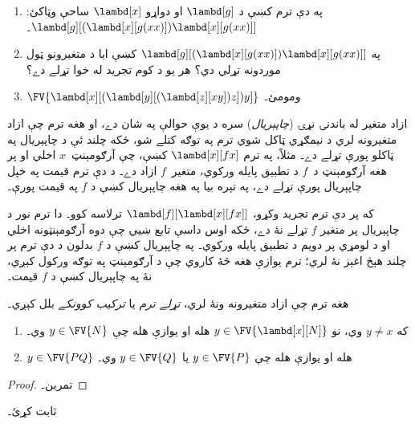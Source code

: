 \documentclass[../../../include/open-logic-section]{subfiles}
\begin{document}
\begin{prob}
  \begin{enumerate}
  \item په دې ترم کښې د $\lambd[g]$ او دواړو $\lambd[x]$ ساحې
    وټاکئ: $\lambd[g][(\lambd[x][g (x x)]) \lambd[x][g (x x)]]$۔
  \item په $\lambd[g][(\lambd[x][g (x x)]) \lambd[x][g (x x)]]$
    کښې ايا د متغيرونو ټول موردونه تړلي دي؟ هر يو د کوم تجريد له
    خوا تړلے دے؟
    \item $\FV{\lambd[x][(\lambd[y][(\lambd[z][x y]) z]) y]}$
    ومومئ۔
  \end{enumerate}
\end{prob}

\begin{explain}
ازاد متغير له باندنۍ نړۍ (\emph{چاپېريال}) سره د يوې حوالې په شان
دے، او هغه ترم چې ازاد متغيرونه لري د نيمګړي ټاکل شوي ترم په توګه
کتلے شو، ځکه چلند ئې د چاپېريال په ټاکلو پورې تړلے دے۔ مثلاً، په
ترم $\lambd[x][f x]$ کښې، چې آرګومېنټ~$x$ اخلي او پر هغه آرګومېنټ
د~$f$ د تطبيق پايله ورکوي، متغير~$f$ ازاد دے۔ د دې ترم قيمت په خپل چاپېريال پورې
تړلے دے، په تېره بيا په هغه چاپېريال کښې د $f$ په قيمت پورې۔

که پر دې ترم تجريد وکړو، $\lambd[f][\lambd[x][f
    x]]$ ترلاسه کوو۔ دا ترم نور د چاپېريال پر متغير $f$ تړلے نۀ
دے، ځکه اوس داسې تابع ښيي چې دوه آرګومېنټونه اخلي او د لومړي پر
دويم د تطبيق پايله ورکوي۔ په چاپېريال کښې د $f$ بدلون د دې ترم پر
چلند هېڅ اغېز نۀ لري؛ ترم يوازې هغه څۀ کاروي چې د آرګومېنټ په توګه
ورکول کېږي، نۀ په چاپېريال کښې د $f$ قيمت۔
\end{explain}

\begin{defn}
  هغه ترم چې ازاد متغيرونه ونۀ لري، \emph{تړلے ترم} يا
  \emph{ترکيب کوونکے} بلل کېږي۔
\end{defn}

\begin{lem}
  \begin{enumerate}
    \item {} که $y \neq x$ وي، نو $y \in
      \FV{\lambd[x][N]}$ هله او يوازې هله چې $y \in \FV{N}$ وي۔
    \item {} $y \in \FV{PQ}$ هله او يوازې هله
      چې $y \in \FV{P}$ يا $y \in \FV{Q}$ وي۔
    \end{enumerate}
\end{lem}

\begin{proof}
  تمرين۔
\end{proof}

\begin{prob}
   ثابت کړئ۔
\end{prob}
\end{document}
